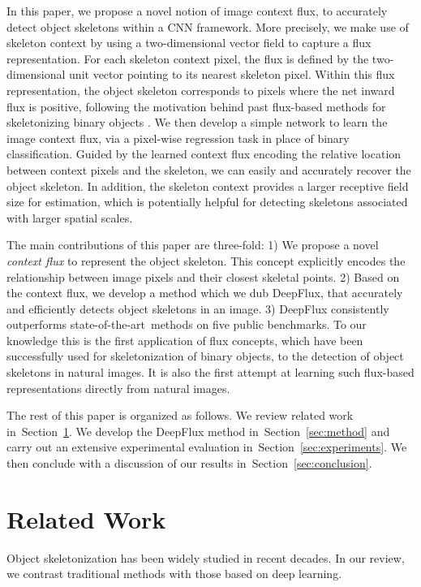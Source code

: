 \documentclass[10pt,twocolumn,letterpaper]{article}
\def\sota{state-of-the-art}
\newcommand{\refsec}[1]{Section~\ref{#1}}
\begin{document}
In this paper, we propose a novel notion of image context flux, to accurately detect object skeletons within a CNN framework. More precisely, we make use of skeleton context by using a two-dimensional vector field to capture a flux representation. For each skeleton context pixel, the flux is defined by the two-dimensional unit vector pointing to its nearest skeleton pixel. Within this flux representation, the object skeleton corresponds to pixels where the net inward flux is positive, following the motivation behind past flux-based methods for skeletonizing binary objects \cite{siddiqi2002hamilton,dimitrov2003}. We then develop a simple network to learn the image context flux, via a pixel-wise regression task in place of binary classification. Guided by the learned context flux encoding the relative location between context pixels and the skeleton, we can easily and accurately recover the object skeleton. In addition, the skeleton context provides a larger receptive field size for estimation, which is potentially helpful for detecting skeletons associated with larger spatial scales.

The main contributions of this paper are three-fold:
1) We propose a novel \emph{context flux} to represent the object skeleton. This concept explicitly encodes the relationship between image pixels and their closest skeletal points.
2) Based on the context flux, we develop a method which we dub DeepFlux, that accurately and efficiently detects object skeletons in an image.
3) DeepFlux consistently outperforms \sota\ methods on five public benchmarks. To our knowledge this is the first application of flux concepts, which have been successfully used for skeletonization of binary objects, to the detection of object skeletons in natural images. It is also the first attempt at learning such flux-based representations directly from natural images.

The rest of this paper is organized as follows. We review related work in~\refsec{sec:related}. We develop the DeepFlux method in~\refsec{sec:method} and carry out an extensive experimental evaluation in~\refsec{sec:experiments}. We then conclude with a discussion of our results in~\refsec{sec:conclusion}.

\section{Related Work} \label{sec:related}

Object skeletonization has been widely studied in recent decades. In our review, we contrast traditional methods with those based on deep learning.
\medskip
\end{document}
